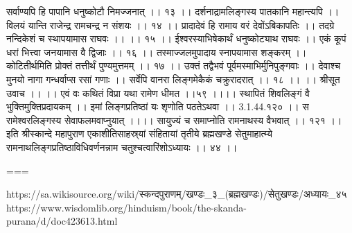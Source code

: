 सर्वाण्यपि हि पापानि धनुष्कोटौ निमज्जनात् ।। १३ ।।
दर्शनाद्रामलिङ्गस्य पातकानि महान्त्यपि ।।
विलयं यान्ति राजेन्द्र रामचन्द्र न संशयः ।। १४ ।।
प्रादादेवं हि रामाय वरं देवोंऽबिकापतिः ।।
तदग्रे नन्दिकेशं च स्थापयामास राघवः ।। ।। १५ ।।
ईश्वरस्याभिषेकार्थं धनुष्कोट्याथ राघवः ।।
एकं कूपं धरां भित्त्वा जनयामास वै द्विजाः ।। १६ ।।
तस्माज्जलमुपादाय स्नापयामास शङ्करम् ।।
कोटितीर्थमिति प्रोक्तं तत्तीर्थं पुण्यमुत्तमम् ।। १७ ।।
उक्तं तद्वैभवं पूर्वमस्माभिर्मुनिपुङ्गवाः ।।
देवाश्च मुनयो नागा गन्धर्वाप्स रसां गणाः ।।
सर्वेपि वानरा लिङ्गमेकैकं चक्रुरादरात् ।। १८ ।।
।। श्रीसूत उवाच ।। ।।
एवं वः कथितं विप्रा यथा रामेण धीमत ।।५९ ।।।।
स्थापितं शिवलिङ्गं वै भुक्तिमुक्तिप्रदायकम् ।।
इमां लिङ्गप्रतिष्ठां यः शृणोति पठतेऽथवा ।। 3.1.44.१२० ।।
स रामेश्वरलिङ्गस्य सेवाफलमवाप्नुयात् ।।।।
सायुज्यं च समाप्नोति रामनाथस्य वैभवात् ।। १२१ ।।
इति श्रीस्कान्दे महापुराण एकाशीतिसाहस्र्यां संहितायां तृतीये ब्रह्मखण्डे सेतुमाहात्म्ये रामनाथलिङ्गप्रतिष्ठाविधिवर्णनन्नाम चतुश्चत्वारिंशोऽध्यायः ।। ४४ ।।


===

https://sa.wikisource.org/wiki/स्कन्दपुराणम्/खण्डः_३_(ब्रह्मखण्डः)/सेतुखण्डः/अध्यायः_४५
https://www.wisdomlib.org/hinduism/book/the-skanda-purana/d/doc423613.html

